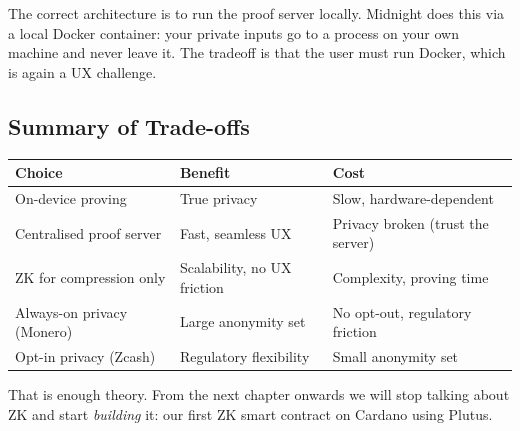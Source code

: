 The correct architecture is to run the proof server locally. Midnight does this via a local Docker container: your private inputs go to a process on your own machine and never leave it. The tradeoff is that the user must run Docker, which is again a UX challenge.

\subsection*{Summary of Trade-offs}

\begin{center}
\begin{tabular}{lll}
  \hline
  \textbf{Choice}            & \textbf{Benefit}                & \textbf{Cost} \\
  \hline
  On-device proving          & True privacy                    & Slow, hardware-dependent \\
  Centralised proof server   & Fast, seamless UX               & Privacy broken (trust the server) \\
  ZK for compression only    & Scalability, no UX friction     & Complexity, proving time \\
  Always-on privacy (Monero) & Large anonymity set             & No opt-out, regulatory friction \\
  Opt-in privacy (Zcash)     & Regulatory flexibility          & Small anonymity set \\
  \hline
\end{tabular}
\end{center}

\bigskip

That is enough theory. From the next chapter onwards we will stop talking about ZK and start \emph{building} it: our first ZK smart contract on Cardano using Plutus.
